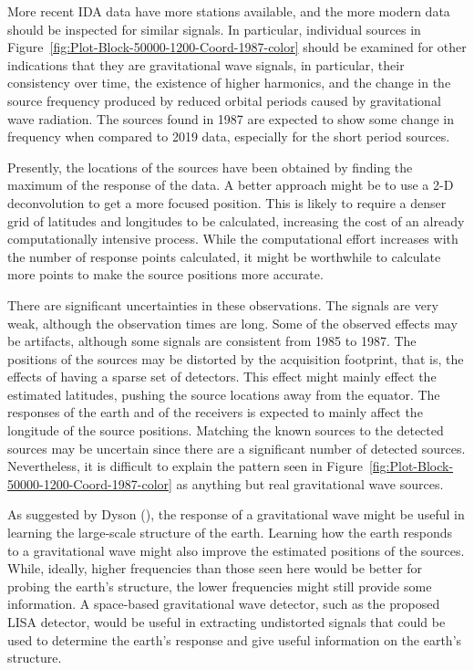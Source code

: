 More recent IDA data have more stations available, and the more modern data should be inspected for similar signals.  In particular, individual sources in Figure~\ref{fig:Plot-Block-50000-1200-Coord-1987-color} should be examined for other indications that they are gravitational wave signals, in particular, their consistency over time, the existence of higher harmonics, and the change in the source frequency produced by reduced orbital periods caused by gravitational wave radiation.  
The sources found in 1987 are expected to show some change in frequency when compared to 2019 data, especially for the short period sources.  

Presently, the locations of the sources have been obtained by finding the maximum of the response of the data.  
A better approach might be to use a 2-D deconvolution to get a more
focused position. This is likely to require a denser grid of latitudes and longitudes to be calculated, increasing the cost of
an already computationally intensive process.
While the computational effort increases with the number of response points calculated, it might be worthwhile to calculate more points to make the source positions more accurate. 

There are significant uncertainties in these observations. The signals are very weak, although the observation times are long.  
Some of the observed effects may be artifacts, although some signals are consistent from 1985 to 1987.  
The positions of the sources may be distorted by the acquisition footprint, that is, the effects of having a sparse set of detectors. 
This effect might mainly effect the estimated latitudes, pushing the source locations away from the equator.  
The responses of the earth and of the receivers is expected to mainly affect the longitude of the source positions.  
Matching the known sources to the detected sources may be uncertain since there are a significant number of detected sources.  
Nevertheless, it is difficult to explain the pattern seen in Figure~\ref{fig:Plot-Block-50000-1200-Coord-1987-color} as anything but real gravitational wave sources.  
 
As suggested by Dyson (\citeyear{dyson}), the response of a gravitational wave might be useful in learning the large-scale structure of the earth.  Learning how the earth responds to a gravitational wave might also improve the estimated positions of the sources.  While, ideally, higher frequencies than those seen here would be better for probing the earth's structure, the lower frequencies might still provide some information.  A space-based gravitational wave detector, such as the proposed LISA detector, would be useful in extracting undistorted signals that could be used to determine the earth's response and give useful information on the earth's structure. 


